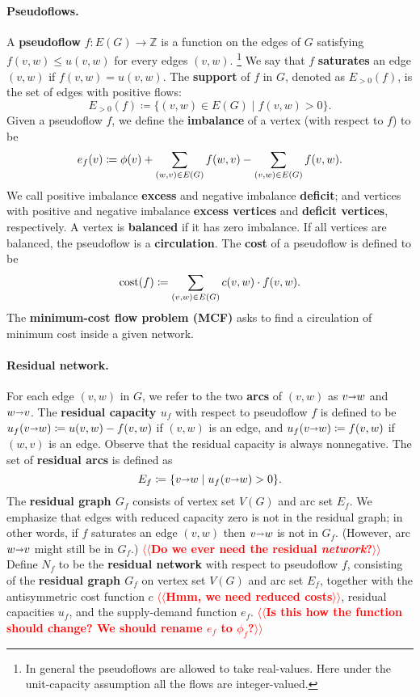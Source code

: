 \documentclass[11pt]{article}
\makeatletter
\def\ints{\mathbb{Z}}
\def\fsupply{\phi}
\def\arcto{\mathord\shortrightarrow}
\def\arc#1#2{#1\arcto#2}
\theoremstyle{plain}
\numberwithin{figure}{section}
\def\cost{\operatorname{cost}}
\def\EMPH#1{\textbf{\boldmath #1}}
\def\n@te#1{\textsf{\boldmath \textbf{$\langle\!\langle$#1$\rangle\!\rangle$}}\leavevmode}
\def\note#1{\textcolor{red}{\n@te{#1}}}
\makeatother
\begin{document}
\paragraph{Pseudoflows.}
A \EMPH{pseudoflow} $f\colon E(G) \to \ints$ is a function on the edges of $G$
satisfying $f(v, w) \leq u(v, w)$ for every edges $(v, w)$.%
\footnote{In general the pseudoflows are allowed to take real-values.  Here under the unit-capacity assumption all the flows are integer-valued.}
We say that $f$ \EMPH{saturates} an edge $(v, w)$ if $f(v, w) = u(v, w)$.
The \EMPH{support} of $f$ in $G$, denoted as \EMPH{$E_{>0}(f)$}, is the set of edges with positive flows:
\[
E_{>0}(f) \coloneqq \{(v, w) \in E(G) \mid f(v, w) > 0\}.
\]
Given a pseudoflow $f$, we define the \EMPH{imbalance} of a vertex (with respect to $f$) to be
\[
\EMPH{$e_f(v)$} \coloneqq \fsupply(v) + \sum_{(w, v) \in E(G)}{f(w, v)} - \sum_{(v, w) \in E(G)}{f(v, w)}.
\]
We call positive imbalance \EMPH{excess} and negative imbalance \EMPH{deficit};
and vertices with positive and negative imbalance \EMPH{excess vertices} and
\EMPH{deficit vertices}, respectively.
A vertex is \EMPH{balanced} if it has zero imbalance.
If all vertices are balanced, the pseudoflow is a \EMPH{circulation}.
The \EMPH{cost} of a pseudoflow
is defined to be
\[
 \EMPH{$\cost(f)$} \coloneqq \sum_{(v, w) \in E(G)} c(v, w) \cdot f(v, w).
\]
The \EMPH{minimum-cost flow problem (MCF)} asks to find a circulation of minimum cost inside a given network.

\paragraph{Residual network.}

For each edge $(v, w)$ in $G$, we refer to the two \EMPH{arcs} of $(v, w)$ as $\arc vw$ and $\arc wv$.
The \EMPH{residual capacity $u_f$} with respect to
pseudoflow $f$ is defined to be $u_f(\arc vw) \coloneqq u(v, w) - f(v, w)$ if $(v, w)$ is an edge, and $u_f(\arc vw) \coloneqq f(v, w)$ if $(w, v)$ is an edge.
Observe that the residual capacity is always nonnegative.
The set of \EMPH{residual arcs} is defined as
\[
\EMPH{$E_f$} \coloneqq \{v \arcto w \mid u_f(v \arcto w) > 0\}.
\]
The \EMPH{residual graph $G_f$} consists of vertex set $V(G)$ and arc set $E_f$.
We emphasize that edges with reduced capacity zero is not in the residual graph; in other words, if $f$ saturates an edge $(v, w)$ then $\arc vw$ is not in $G_f$.  (However, arc $\arc wv$ might still be in $G_f$.)
%
\note{Do we ever need the residual \emph{network}?}
Define \EMPH{$N_f$} to be the \EMPH{residual network} with respect to pseudoflow $f$, consisting of the \EMPH{residual graph $G_f$} on vertex set $V(G)$ and arc set $E_f$, together with the antisymmetric cost function $c$ \note{Hmm, we need reduced costs}, residual capacities $u_f$, and the supply-demand function $e_f$. \note{Is this how the function should change? We should rename $e_f$ to $\fsupply_f$?}
\end{document}
